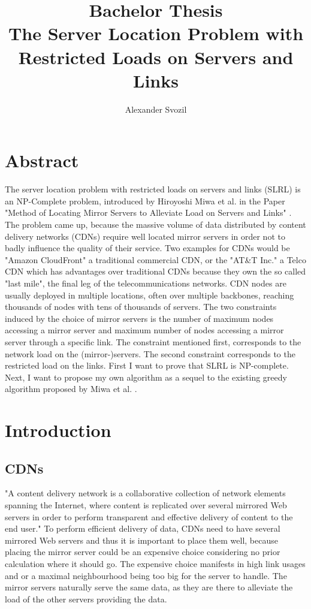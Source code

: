 \documentclass [12pt]{article}
\begin{document}
\author{Alexander Svozil}
\title{Bachelor Thesis \\ The Server Location Problem with Restricted Loads 
on Servers and Links}

\maketitle

\section{Abstract}
The server location problem with restricted loads on servers and links (SLRL) is an NP-Complete
problem, introduced by Hiroyoshi Miwa et al. in the Paper "Method of Locating Mirror Servers
to Alleviate Load on Servers and Links" \cite{mirrorserver}. The problem 
came up, because the massive volume of data distributed by content delivery networks (CDNs) 
require well located mirror servers in order not to badly influence the quality of their service.
Two examples for CDNs would be "Amazon CloudFront" a traditional commercial CDN, or the "AT\&T Inc."
a Telco CDN which has advantages over traditional CDNs because they own the so called "last mile",
the final leg of the telecommunications networks. CDN nodes are usually deployed in multiple 
locations, often over multiple backbones, reaching thousands of nodes with tens of thousands of 
servers. \cite{wiki:cdn} \cite{wiki:lastmile}
The two constraints induced by the choice of mirror servers is the number of maximum nodes
accessing a mirror server and maximum number of nodes accessing a mirror server 
through a specific link. The constraint mentioned first, corresponds to the network load on
the (mirror-)servers. The second constraint corresponds to the restricted load on the links.
First I want to prove that SLRL is NP-complete. Next, I want to propose my own algorithm as a
sequel to the existing greedy algorithm proposed by Miwa et al. \cite{mirrorserver}.


\tableofcontents

\section{Introduction}
\subsection {CDNs}
"A content delivery network is a collaborative collection of network elements spanning
the Internet, where content is replicated over several mirrored Web servers in order
to perform transparent and effective delivery of content to the end user."\cite[p. 3]{Buyya:2008:CDN:1457653}
To perform efficient delivery of data, CDNs need to have several mirrored Web servers
and thus it is important to place them well, because placing the mirror server 
could be an expensive choice considering no prior calculation where it should go. 
The expensive choice manifests in high link usages and or a maximal neighbourhood being
too big for the server to handle.
The mirror servers naturally serve the same data, as they are there to alleviate the 
load of the other servers providing the data.
\end{document}
